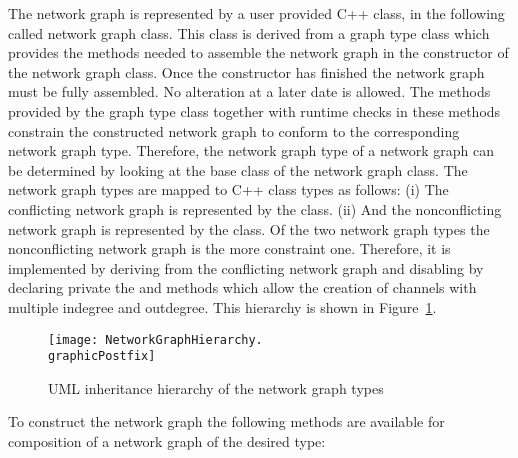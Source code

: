 The network graph is represented by a user provided C++ class, in the following called
network graph class. This class is derived from a \SysteMoC{} graph type class which
provides the methods needed to assemble the network graph in the constructor
of the network graph class. Once the constructor has finished the network graph must
be fully assembled. No alteration at a later date is allowed.
The methods provided by the \SysteMoC{} graph type class together with runtime checks
in these methods constrain the constructed network graph to conform to the corresponding
network graph type.
Therefore, the network graph type of a network graph can be determined by looking
at the base class of the network graph class.
The network graph types are mapped to C++ class types as follows:
(i) The conflicting network graph is represented by the  class.
(ii) And the nonconflicting network graph is represented by the  class.
Of the two network graph types the nonconflicting network graph is the more constraint
one. Therefore, it is implemented by deriving from the conflicting network graph
and disabling by declaring private the  and 
methods which allow the creation of channels with multiple indegree and outdegree.
This hierarchy is shown in Figure~\ref{network-graph-hierarchy}.

\begin{figure}[h]
\centering
\texttt{[image: NetworkGraphHierarchy.\\graphicPostfix]}\\
\caption{\label{network-graph-hierarchy}UML inheritance hierarchy of the network graph types}
\end{figure}

To construct the network graph the following methods are available for
composition of a network graph of the desired type:

